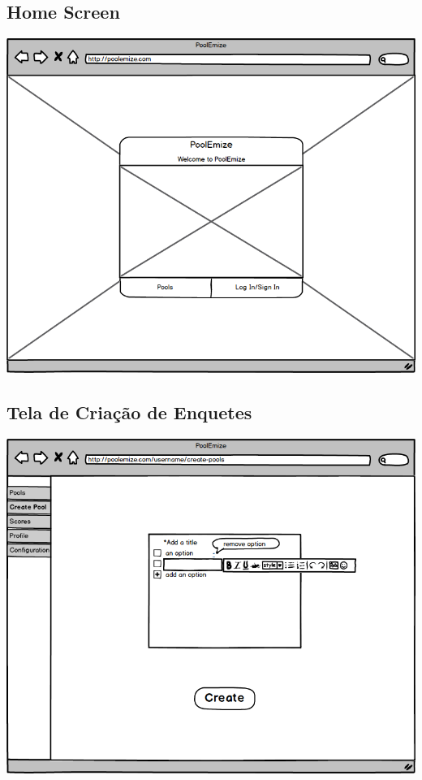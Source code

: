 \documentclass[a4paper,12pt]{report}
\begin{document}
\subsection*{Home Screen}
\markright{}
\includegraphics[width=14.3cm]{mockups/HomeScreen.png}
\subsection*{Tela de Criação de Enquetes}
\markright{}
\includegraphics[width=14.3cm]{mockups/CreatePoollsTab.png}
\end{document}
